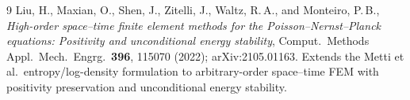 \documentclass[11pt]{article}
\begin{document}
\begin{thebibliography}{9}
Liu, H., Maxian, O., Shen, J., Zitelli, J., Waltz, R.\,A., and Monteiro, P.\,B.,
\emph{High-order space--time finite element methods for the
Poisson--Nernst--Planck equations: Positivity and unconditional energy
stability},
Comput.\ Methods Appl.\ Mech.\ Engrg.\ \textbf{396}, 115070 (2022);
arXiv:2105.01163.
Extends the Metti et al.\ entropy/log-density formulation to arbitrary-order
space--time FEM with positivity preservation and unconditional energy
stability.

\end{thebibliography}
\end{document}
